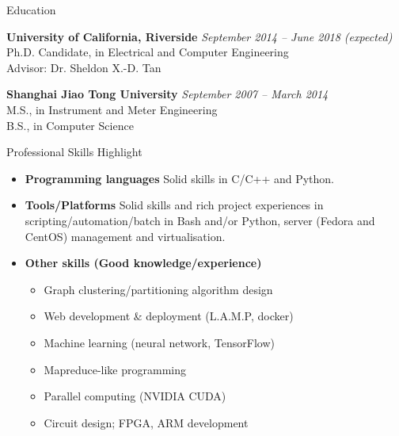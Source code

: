 \documentclass{resume} %
\begin{document}

\begin{rSection}{Education}

{\bf University of California, Riverside} \hfill {\em September 2014 -- June 2018 (expected)} \\
Ph.D. Candidate, in Electrical and Computer Engineering \\
Advisor: Dr. Sheldon X.-D. Tan

{\bf Shanghai Jiao Tong University} \hfill {\em September 2007 -- March 2014} \\
M.S., in Instrument and Meter Engineering\\
B.S., in Computer Science

\end{rSection}

\begin{rSection}{Professional Skills Highlight}

    \begin{itemize}

        \item \textbf{Programming languages} Solid skills in C/C++ and Python.

        \item \textbf{Tools/Platforms} Solid skills and rich project
            experiences in scripting/automation/batch in Bash and/or Python,
            server (Fedora and CentOS) management and virtualisation.

        \item \textbf{Other skills (Good knowledge/experience)}

            \begin{itemize}
                \item Graph clustering/partitioning algorithm design
                \item Web development \& deployment (L.A.M.P, docker)
                \item Machine learning (neural network, TensorFlow)
                \item Mapreduce-like programming
                \item Parallel computing (NVIDIA CUDA)
                \item Circuit design; FPGA, ARM development
            \end{itemize}

    \end{itemize}

\end{rSection}
\end{document}
